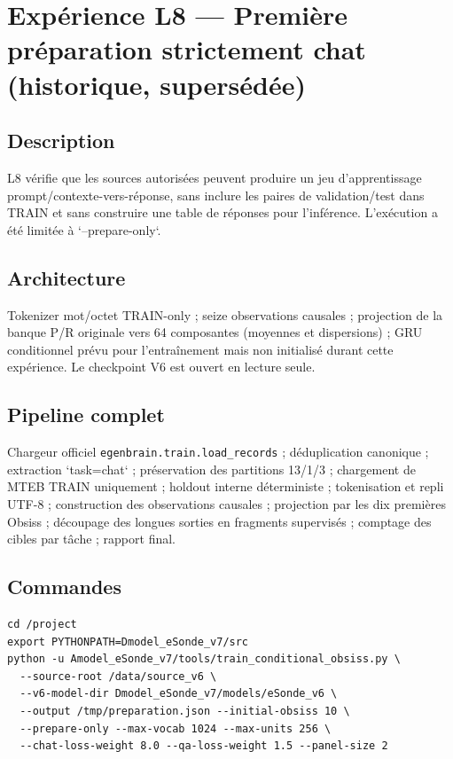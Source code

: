 \documentclass[11pt,a4paper]{report}
\begin{document}
\chapter[L8 — préparation chat]{Expérience L8 — Première préparation strictement chat (historique, supersédée)}
\section{Description}
L8 vérifie que les sources autorisées peuvent produire un jeu d'apprentissage prompt/contexte-vers-réponse, sans inclure les paires de validation/test dans TRAIN et sans construire une table de réponses pour l'inférence. L'exécution a été limitée à `--prepare-only`.
\section{Architecture}
Tokenizer mot/octet TRAIN-only ; seize observations causales ; projection de la banque P/R originale vers 64 composantes (moyennes et dispersions) ; GRU conditionnel prévu pour l'entraînement mais non initialisé durant cette expérience. Le checkpoint V6 est ouvert en lecture seule.
\section{Pipeline complet}
\begin{sloppypar}Chargeur officiel \texttt{egenbrain.train.load\_records} ; déduplication canonique ; extraction `task=chat` ; préservation des partitions 13/1/3 ; chargement de MTEB TRAIN uniquement ; holdout interne déterministe ; tokenisation et repli UTF-8 ; construction des observations causales ; projection par les dix premières Obsiss ; découpage des longues sorties en fragments supervisés ; comptage des cibles par tâche ; rapport final.\end{sloppypar}
\section{Commandes}
\begin{verbatim}
cd /project
export PYTHONPATH=Dmodel_eSonde_v7/src
python -u Amodel_eSonde_v7/tools/train_conditional_obsiss.py \
  --source-root /data/source_v6 \
  --v6-model-dir Dmodel_eSonde_v7/models/eSonde_v6 \
  --output /tmp/preparation.json --initial-obsiss 10 \
  --prepare-only --max-vocab 1024 --max-units 256 \
  --chat-loss-weight 8.0 --qa-loss-weight 1.5 --panel-size 2
\end{verbatim}
\end{document}
